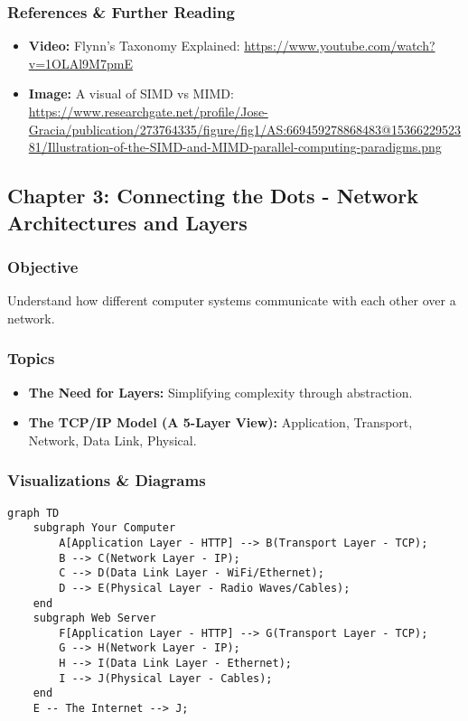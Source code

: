 \documentclass{article}
\begin{document}
\subsubsection{References \& Further Reading}
\begin{itemize}
    \item \textbf{Video:} Flynn's Taxonomy Explained: \url{https://www.youtube.com/watch?v=1OLAl9M7pmE}
    \item \textbf{Image:} A visual of SIMD vs MIMD: \url{https://www.researchgate.net/profile/Jose-Gracia/publication/273764335/figure/fig1/AS:669459278868483@1536622952381/Illustration-of-the-SIMD-and-MIMD-parallel-computing-paradigms.png}
\end{itemize}

\subsection{Chapter 3: Connecting the Dots - Network Architectures and Layers}
\subsubsection{Objective}
Understand how different computer systems communicate with each other over a network.

\subsubsection{Topics}
\begin{itemize}
    \item \textbf{The Need for Layers:} Simplifying complexity through abstraction.
    \item \textbf{The TCP/IP Model (A 5-Layer View):} Application, Transport, Network, Data Link, Physical.
\end{itemize}

\subsubsection{Visualizations \& Diagrams}
\begin{verbatim}
graph TD
    subgraph Your Computer
        A[Application Layer - HTTP] --> B(Transport Layer - TCP);
        B --> C(Network Layer - IP);
        C --> D(Data Link Layer - WiFi/Ethernet);
        D --> E(Physical Layer - Radio Waves/Cables);
    end
    subgraph Web Server
        F[Application Layer - HTTP] --> G(Transport Layer - TCP);
        G --> H(Network Layer - IP);
        H --> I(Data Link Layer - Ethernet);
        I --> J(Physical Layer - Cables);
    end
    E -- The Internet --> J;
\end{verbatim}
\end{document}
